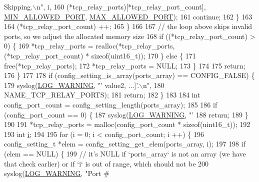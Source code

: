 \begin{DoxyCode}
{{{{       Skipping.\(\backslash\)n"}, i,
160                        (*tcp\_relay\_ports)[*tcp\_relay\_port\_count], 
      \hyperlink{tox-bootstrapd_8c_a3ef213aa33f9321104faf75dfe823623}{MIN\_ALLOWED\_PORT}, \hyperlink{tox-bootstrapd_8c_a83828e6f5b4b788b1781b298a3a221cd}{MAX\_ALLOWED\_PORT});
161                 \textcolor{keywordflow}{continue};
162             \}
163 
164             (*tcp\_relay\_port\_count) ++;
165         \}
166 
167         \textcolor{comment}{// the loop above skips invalid ports, so we adjust the allocated memory size}
168         \textcolor{keywordflow}{if} ((*tcp\_relay\_port\_count) > 0) \{
169             *tcp\_relay\_ports = realloc(*tcp\_relay\_ports, (*tcp\_relay\_port\_count) * \textcolor{keyword}{sizeof}(uint16\_t));
170         \} \textcolor{keywordflow}{else} \{
171             free(*tcp\_relay\_ports);
172             *tcp\_relay\_ports = NULL;
173         \}
174 
175         \textcolor{keywordflow}{return};
176     \}
177 
178     \textcolor{keywordflow}{if} (config\_setting\_is\_array(ports\_array) == CONFIG\_FALSE) \{
179         syslog(\hyperlink{logger_8h_aa5a9053636a30269210c54e734e0d583a8f6fe15bfe15104da6d1b360194a5400}{LOG\_WARNING}, \textcolor{stringliteral}{"'%
       value2, ...]'.\(\backslash\)n"},
180                NAME\_TCP\_RELAY\_PORTS);
181         \textcolor{keywordflow}{return};
182     \}
183 
184     \textcolor{keywordtype}{int} config\_port\_count = config\_setting\_length(ports\_array);
185 
186     \textcolor{keywordflow}{if} (config\_port\_count == 0) \{
187         syslog(\hyperlink{logger_8h_aa5a9053636a30269210c54e734e0d583a8f6fe15bfe15104da6d1b360194a5400}{LOG\_WARNING}, \textcolor{stringliteral}{"'%
188         \textcolor{keywordflow}{return};
189     \}
190 
191     *tcp\_relay\_ports = malloc(config\_port\_count * \textcolor{keyword}{sizeof}(uint16\_t));
192 
193     \textcolor{keywordtype}{int} \hyperlink{toxav__many__test_8c_acb559820d9ca11295b4500f179ef6392}{i};
194 
195     \textcolor{keywordflow}{for} (i = 0; i < config\_port\_count; i ++) \{
196         config\_setting\_t *elem = config\_setting\_get\_elem(ports\_array, i);
197 
198         \textcolor{keywordflow}{if} (elem == NULL) \{
199             \textcolor{comment}{// it's NULL if `ports\_array` is not an array (we have that check earlier) or if `i` is out of
       range, which should not be}
200             syslog(\hyperlink{logger_8h_aa5a9053636a30269210c54e734e0d583a8f6fe15bfe15104da6d1b360194a5400}{LOG\_WARNING}, \textcolor{stringliteral}{"Port #%
}}}}}
\end{DoxyCode}
